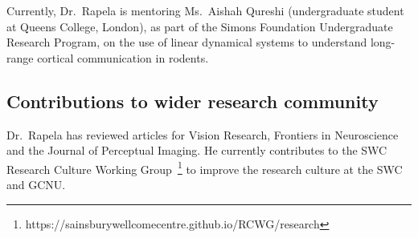Currently, Dr.~Rapela is mentoring Ms.~Aishah Qureshi (undergraduate student at
Queens College, London), as part of the Simons Foundation Undergraduate Research
Program, on the use of linear dynamical systems to understand long-range
cortical communication in rodents.


% 

\subsection{Contributions to wider research community}

Dr.~Rapela has reviewed articles for Vision Research, Frontiers in Neuroscience
and the Journal of Perceptual Imaging. He currently contributes to the SWC
Research Culture Working
Group~\footnote{https://sainsburywellcomecentre.github.io/RCWG/research} to
improve the research culture at the SWC and GCNU.




% 
